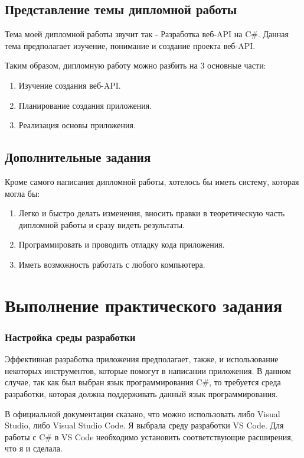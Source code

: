 \documentclass[a4paper,12pt]{report}
\begin{document}
\section{Представление темы дипломной работы}

Тема моей дипломной работы звучит так - Разработка веб-\ac{API} на C\#.
Данная тема предполагает изучение, понимание и создание проекта веб-\ac{API}.

Таким образом, дипломную работу можно разбить на 3 основные части:
\begin{enumerate}
  \item Изучение создания веб-\ac{API}.
  \item Планирование создания приложения.
  \item Реализация основы приложения.
\end{enumerate}

\section{Дополнительные задания}

Кроме самого написания дипломной работы, хотелось бы иметь систему, которая могла бы:
\begin{enumerate}
  \item Легко и быстро делать изменения, вносить правки в теоретическую часть дипломной работы и сразу видеть результаты.
  \item Программировать и проводить отладку кода приложения.
  \item Иметь возможность работать с любого компьютера.
\end{enumerate}

\chapter{Выполнение практического задания}

\subsection{Настройка среды разработки}

Эффективная разработка приложения предполагает, также, и использование некоторых инструментов, которые помогут в написании приложения.
В данном случае, так как был выбран язык программирования C\#, то требуется среда разработки, которая должна поддерживать данный язык программирования.

В официальной документации сказано, что можно использовать либо Visual Studio, либо Visual Studio Code. Я выбрала среду разработки VS Code. 
Для работы с C\# в VS Code необходимо установить соответствующие расширения, что я и сделала.
\end{document}
